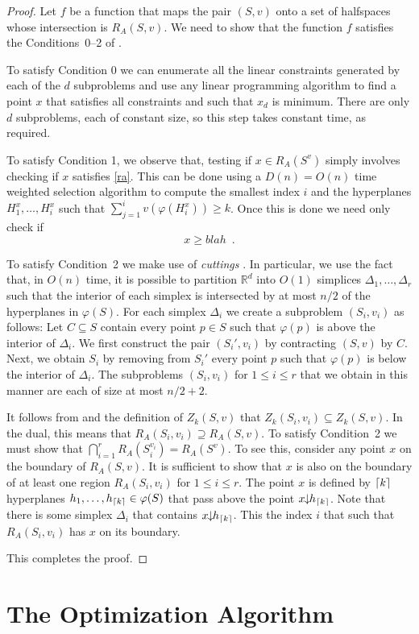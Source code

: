 \documentclass[lotsofwhite]{patmorin}
\newcommand{\drop}{\!\!\downarrow\!\!}
\newcommand{\dual}{\varphi}
\newcommand{\R}{\mathbb{R}}
\begin{document}
\begin{proof}
Let $f$ be a function that maps the pair $(S,v)$ onto a set of
halfspaces whose intersection is $R_A(S,v)$.  We need to show that the
function $f$ satisfies the Conditions~0--2 of .

To satisfy Condition 0 we can enumerate all the linear constraints
generated by each of the $d$ subproblems and use any linear
programming algorithm to find a point $x$ that satisfies all
constraints and such that $x_d$ is minimum.  There are only $d$
subproblems, each of constant size, so this step takes constant time,
as required.

To satisfy Condition 1, we observe that, testing if $x\in R_A(S^v)$
simply involves checking if $x$ satisfies \eqref{ra}.  This can be
done using a $D(n)=O(n)$ time weighted selection algorithm \cite{X} to
compute the smallest index $i$ and the hyperplanes
$H_{1}^x,\ldots,H_{i}^x$ such that $\sum_{j=1}^iv(\dual(H_{i}^x)) \ge
k$.  Once this is done we need only check if 
\[
     x \ge blah \enspace .
\] 

To satisfy Condition~2 we make use of \emph{cuttings} \cite{X}.  In
particular, we use the fact that, in $O(n)$ time, it is possible to
partition $\R^d$ into $O(1)$ simplices
$\Delta_1,\ldots,\Delta_r$ such that the interior of each simplex is
intersected by at most $n/2$ of the hyperplanes in $\dual(S)$.  For
each simplex $\Delta_i$ we create a subproblem $(S_i,v_i)$ as follows:
Let $C\subseteq S$ contain every point $p\in S$ such that $\dual(p)$
is above the interior of $\Delta_i$.  We first construct the pair
$(S_i',v_i)$ by contracting $(S,v)$ by $C$.  Next, we obtain $S_i$ by
removing from $S_i'$ every point $p$ such that $\dual(p)$ is below the
interior of $\Delta_i$.  The subproblems $(S_i,v_i)$ for $1\le i\le r$
that we obtain in this manner are each of size at most $n/2+2$.

It follows from  and the definition of $Z_k(S,v)$
that $Z_k(S_i,{v_i})\subseteq Z_k(S,v)$.  In the dual, this means that
$R_A(S_i,{v_i})\supseteq R_A(S,v)$.  To satisfy Condition~2 we must
show that $\bigcap_{i=1}^r R_A(S_i^{v_i}) = R_A(S^v)$.  To see this,
consider any point $x$ on the boundary of $R_A(S,v)$.  It is
sufficient to show that $x$ is also on the boundary of at least one
region $R_A(S_i,{v_i})$ for $1\le i\le r$.  The point $x$ is defined
by $\left\lceil k \right\rceil$ hyperplanes $h_1,\ldots,h_{\ceil{k}}\in\dual(S)$ that pass
above the point $x\drop h_{\ceil{k}}$.  Note that there is some
simplex $\Delta_i$ that contains
$x\drop h_{\ceil{k}}$.  This the index $i$ that such that
$R_A(S_i,v_i)$ has $x$ on its boundary.

This completes the proof.
\end{proof}


\section{The Optimization Algorithm}
\end{document}

